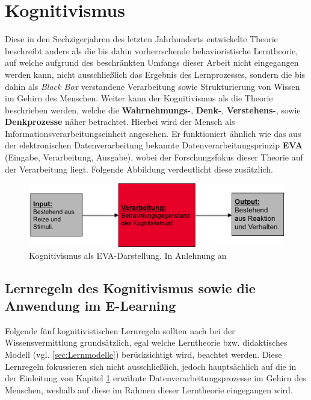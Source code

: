 \chapter{Kognitivismus}
\label{cha:Kognitivismus}

Diese in den Sechzigerjahren des letzten Jahrhunderts entwickelte Theorie beschreibt anders als die bis dahin vorherrschende behavioristische Lerntheorie, auf welche aufgrund des beschränkten Umfangs dieser Arbeit nicht eingegangen werden kann, nicht ausschließlich das Ergebnis des Lernprozesses, sondern die bis dahin als \emph{Black Box} verstandene Verarbeitung sowie Strukturierung von Wissen im Gehirn des Menschen. \cite[S. 155]{Erpenbeck.2007} 
Weiter kann der Kognitivismus als die Theorie beschrieben werden, welche die \textbf{Wahrnehmungs-}, \textbf{Denk-}, \textbf{Verstehens-}, sowie \textbf{Denkprozesse} näher betrachtet. Hierbei wird der Mensch als Informationsverarbeitungseinheit angesehen. Er funktioniert ähnlich wie das aus der elektronischen Datenverarbeitung bekannte Datenverarbeitungsprinzip \textbf{EVA} (Eingabe, Verarbeitung, Ausgabe), wobei der Forschungsfokus dieser Theorie auf der Verarbeitung liegt. Folgende Abbildung verdeutlicht diese zusätzlich. \cite{AnsgarA.PlassmannProf.Dr.GunterSchmitt.2007}

\begin{figure}[h]
	\centering
	\includegraphics[width=1.0\textwidth]{Abbildungen/Kognitivismus1.PNG}
	\caption{Kognitivismus als EVA-Darstellung. In Anlehnung an \cite[S. 12]{SusanneMeir.}}
	\label{fig:Kognitivismusdarstellung}
\end{figure}

\section{Lernregeln des Kognitivismus sowie die Anwendung im E-Learning}
Folgende fünf kognitivistischen Lernregeln sollten nach \cite{Vontobel.2006} bei der Wissensvermittlung grundsätzlich, egal welche Lerntheorie bzw. didaktisches Modell (vgl. \ref{sec:Lernmodelle}) berücksichtigt wird, beachtet werden. Diese Lernregeln fokussieren sich nicht ausschließlich, jedoch hauptsächlich auf die in der Einleitung von Kapitel \ref{cha:Kognitivismus} erwähnte Datenverarbeitungsprozesse im Gehirn des Menschen, weshalb auf diese im Rahmen dieser Lerntheorie eingegangen wird.\cite[S. 10]{Vontobel.2006}

